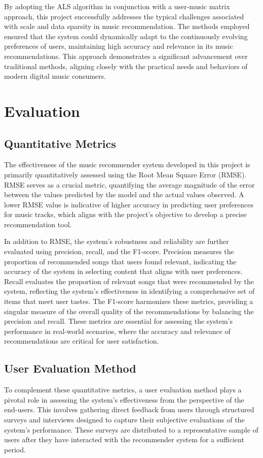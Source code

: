 \documentclass[10pt,twocolumn]{article}
\begin{document}
By adopting the ALS algorithm in conjunction with a user-music matrix approach, this project successfully addresses the typical challenges associated with scale and data sparsity in music recommendation. The methods employed ensured that the system could dynamically adapt to the continuously evolving preferences of users, maintaining high accuracy and relevance in its music recommendations. This approach demonstrates a significant advancement over traditional methods, aligning closely with the practical needs and behaviors of modern digital music consumers.

\section{Evaluation}
\subsection{Quantitative Metrics}

The effectiveness of the music recommender system developed in this project is primarily quantitatively assessed using the Root Mean Square Error (RMSE). RMSE serves as a crucial metric, quantifying the average magnitude of the error between the values predicted by the model and the actual values observed. A lower RMSE value is indicative of higher accuracy in predicting user preferences for music tracks, which aligns with the project's objective to develop a precise recommendation tool.

In addition to RMSE, the system's robustness and reliability are further evaluated using precision, recall, and the F1-score. Precision measures the proportion of recommended songs that users found relevant, indicating the accuracy of the system in selecting content that aligns with user preferences. Recall evaluates the proportion of relevant songs that were recommended by the system, reflecting the system's effectiveness in identifying a comprehensive set of items that meet user tastes. The F1-score harmonizes these metrics, providing a singular measure of the overall quality of the recommendations by balancing the precision and recall. These metrics are essential for assessing the system's performance in real-world scenarios, where the accuracy and relevance of recommendations are critical for user satisfaction.

\subsection{User Evaluation Method}
To complement these quantitative metrics, a user evaluation method plays a pivotal role in assessing the system's effectiveness from the perspective of the end-users. This involves gathering direct feedback from users through structured surveys and interviews designed to capture their subjective evaluations of the system's performance. These surveys are distributed to a representative sample of users after they have interacted with the recommender system for a sufficient period.
\end{document}
